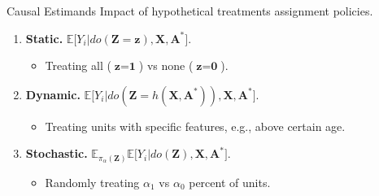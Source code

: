 \documentclass{beamer}
\def \bz {\textbf{z}}
\def \bZ {\textbf{Z}}
\def \bA {\textbf{A}}
\def \bX {\textbf{X}}
\def \bbE {\mathbb{E}}
\begin{document}
    \begin{frame}{Causal Estimands}
        \large
        Impact of hypothetical treatments assignment policies.
        \vspace{0.3cm}
        \pause
        \begin{enumerate}
            \item \textbf{Static.} $\bbE\big[Y_i \vert do(\bZ=\bz),\bX,\bA^\ast\big]$.
            \begin{itemize}
                \item Treating all ($\bz=\textbf{1}$) vs none ($\bz = \textbf{0}$).
            \end{itemize}
            \pause
            \vspace{0.2cm}
            \item \textbf{Dynamic.} $\bbE\big[Y_i \vert do(\bZ=h(\bX,\bA^\ast)),\bX,\bA^\ast\big]$.
            \begin{itemize}
                \item Treating units with specific features, e.g., above certain age. 
            \end{itemize}
            \pause
            \vspace{0.2cm}
            \item \textbf{Stochastic.} $\bbE_{\pi_\alpha(\bZ)}\bbE\big[Y_i \vert do(\bZ),\bX,\bA^\ast\big]$.
            \begin{itemize}
                \item Randomly treating $\alpha_1$ vs $\alpha_0$ percent of units.
            \end{itemize}
        \end{enumerate}
    \end{frame}
\end{document}
